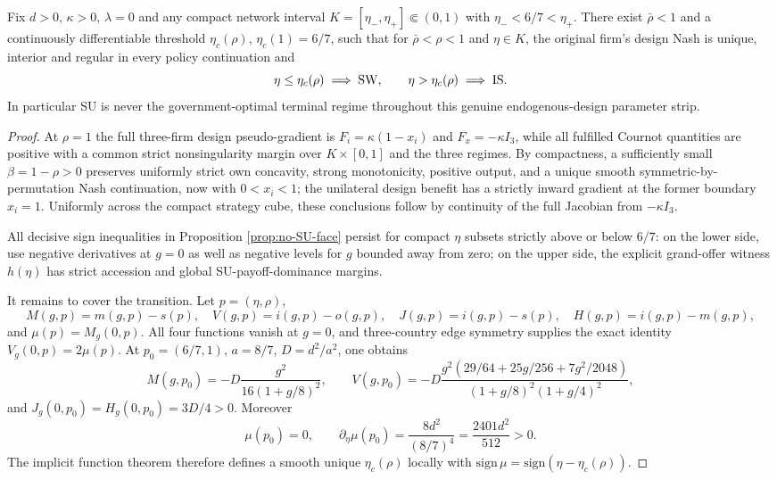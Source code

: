 \begin{proposition}
\label{prop:no-SU-endogenous}
Fix $d>0$, $\kappa>0$, $\lambda=0$ and any compact network
interval $K=[\eta_-,\eta_+]\Subset(0,1)$ with
$\eta_-<6/7<\eta_+$. There exist $\bar\rho<1$ and a
continuously differentiable threshold $\eta_c(\rho)$,
$\eta_c(1)=6/7$, such that for $\bar\rho<\rho<1$
and $\eta\in K$, the original firm's design Nash is unique,
interior and regular in every policy continuation and
\[
 \eta\le\eta_c(\rho)\implies {\rm SW},\qquad
 \eta>\eta_c(\rho)\implies {\rm IS}.
\]
In particular SU is never the government-optimal terminal
regime throughout this genuine endogenous-design parameter
strip.
\end{proposition}
\begin{proof}
At $\rho=1$ the full three-firm design pseudo-gradient is
$F_i=\kappa(1-x_i)$ and $F_x=-\kappa I_3$,
while all fulfilled Cournot quantities are positive with a
common strict nonsingularity margin over $K\times[0,1]$
and the three regimes. By compactness, a sufficiently small
$\beta=1-\rho>0$ preserves uniformly strict own concavity,
strong monotonicity, positive output, and a unique smooth
symmetric-by-permutation Nash continuation, now with
$0<x_i<1$; the unilateral design benefit has a strictly
inward gradient at the former boundary $x_i=1$.
Uniformly across the compact strategy cube, these conclusions
follow by continuity of the full Jacobian from $-\kappa I_3$.

All decisive sign inequalities in Proposition
\ref{prop:no-SU-face} persist for compact $\eta$ subsets
strictly above or below $6/7$: on the lower side, use
negative derivatives at $g=0$ as well as negative levels
for $g$ bounded away from zero; on the upper side, the
explicit grand-offer witness $h(\eta)$ has strict
accession and global SU-payoff-dominance margins.

It remains to cover the transition. Let $p=(\eta,\rho)$,
\[
 M(g,p)=m(g,p)-s(p),\quad
 V(g,p)=i(g,p)-o(g,p),\quad
 J(g,p)=i(g,p)-s(p),\quad
 H(g,p)=i(g,p)-m(g,p),
\]
and $\mu(p)=M_g(0,p)$. All four functions vanish
at $g=0$, and three-country edge symmetry supplies the
exact identity $V_g(0,p)=2\mu(p)$.
At $p_0=(6/7,1)$, $a=8/7$, $D=d^2/a^2$, one obtains
\[
 M(g,p_0)=-D\frac{g^2}{16(1+g/8)^2},\qquad
 V(g,p_0)=-D\frac{g^2(29/64+25g/256+7g^2/2048)}
 {(1+g/8)^2(1+g/4)^2},
\]
and $J_g(0,p_0)=H_g(0,p_0)=3D/4>0$.
Moreover
\[
 \mu(p_0)=0,\qquad
 \partial_\eta\mu(p_0)=\frac{8d^2}{(8/7)^4}
 =\frac{2401d^2}{512}>0.
\]
The implicit function theorem therefore defines a smooth
unique $\eta_c(\rho)$ locally with
$\mathrm{sign}\,\mu=\mathrm{sign}(\eta-\eta_c(\rho))$.


\end{proof}
